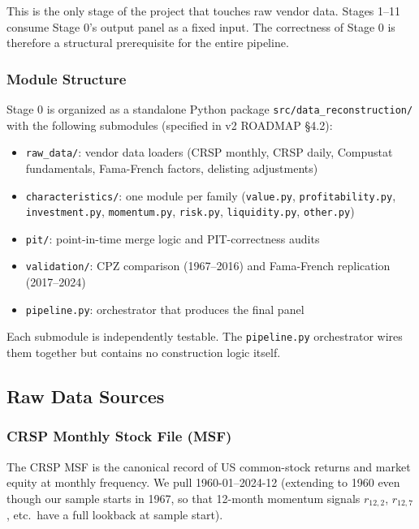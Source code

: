 This is the only stage of the project that touches raw vendor data.
Stages 1--11 consume Stage 0's output panel as a fixed input. The
correctness of Stage 0 is therefore a structural prerequisite for the
entire pipeline.

\subsubsection{Module Structure}

Stage 0 is organized as a standalone Python package
\texttt{src/data\_reconstruction/} with the following submodules
(specified in v2 ROADMAP \S 4.2):

\begin{itemize}
\item \texttt{raw\_data/}: vendor data loaders (CRSP monthly, CRSP daily,
      Compustat fundamentals, Fama-French factors, delisting adjustments)
\item \texttt{characteristics/}: one module per family
      (\texttt{value.py}, \texttt{profitability.py}, \texttt{investment.py},
      \texttt{momentum.py}, \texttt{risk.py}, \texttt{liquidity.py},
      \texttt{other.py})
\item \texttt{pit/}: point-in-time merge logic and PIT-correctness audits
\item \texttt{validation/}: CPZ comparison (1967--2016) and Fama-French
      replication (2017--2024)
\item \texttt{pipeline.py}: orchestrator that produces the final panel
\end{itemize}

Each submodule is independently testable. The \texttt{pipeline.py}
orchestrator wires them together but contains no construction logic
itself.

\subsection{Raw Data Sources}
\label{subsec:stage0-raw}

\subsubsection{CRSP Monthly Stock File (MSF)}

The CRSP MSF is the canonical record of US common-stock returns and
market equity at monthly frequency. We pull
1960-01--2024-12 (extending to 1960 even though our sample starts in
1967, so that 12-month momentum signals
$r_{12,2}$, $r_{12,7}$, etc.\ have a full lookback at sample start).

